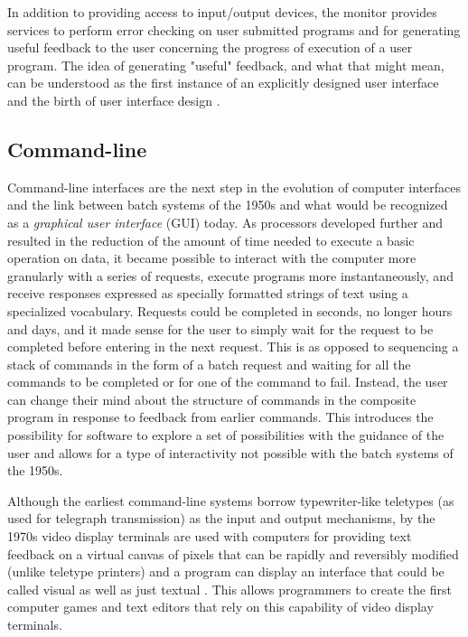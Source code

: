 In addition to providing access to input/output devices, the monitor provides services to perform error checking on user submitted programs and for generating useful feedback to the user concerning the progress of execution of a user program. The idea of generating "useful" feedback, and what that might mean, can be understood as the first instance of an explicitly designed user interface and the birth of user interface design \cite{unix2008}.

\subsection{Command-line}

Command-line interfaces are the next step in the evolution of computer interfaces and the link between batch systems of the 1950s and what would be recognized as a \emph{graphical user interface} (GUI) today. As processors developed further and resulted in the reduction of the amount of time needed to execute a basic operation on data, it became possible to interact with the computer more granularly with a series of requests, execute programs more instantaneously, and receive responses expressed as specially formatted strings of text using a specialized vocabulary. Requests could be completed in seconds, no longer hours and days, and it made sense for the user to simply wait for the request to be completed before entering in the next request. This is as opposed to sequencing a stack of commands in the form of a batch request and waiting for all the commands to be completed or for one of the command to fail. Instead, the user can change their mind about the structure of commands in the composite program in response to feedback from earlier commands. This introduces the possibility for software to explore a set of possibilities with the guidance of the user and allows for a type of interactivity not possible with the batch systems of the 1950s. 

Although the earliest command-line systems borrow typewriter-like teletypes (as used for telegraph transmission) as the input and output mechanisms, by the 1970s video display terminals are used with computers for providing text feedback on a virtual canvas of pixels that can be rapidly and reversibly modified (unlike teletype printers) and a program can display an interface that could be called visual as well as just textual \cite{unix2008}. This allows programmers to create the first computer games and text editors that rely on this capability of video display terminals.

